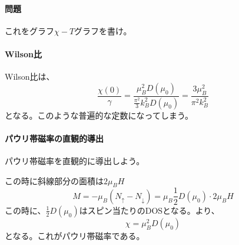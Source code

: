 \documentclass[titlepage]{ltjsarticle}
\begin{document}
\paragraph{問題}これをグラフ\(\chi-T\)グラフを書け。


\paragraph{Wilson比}
Wilson比は、
\begin{equation}
  \frac{\chi(0)}{\gamma} = \frac{\mu_B^2 D(\mu_0)}{\frac{\pi^2}{3}k_B^2 D(\mu_0)} = \frac{3\mu_B^2}{\pi^2 k_B^2}
\end{equation}
となる。このような普遍的な定数になってしまう。

\paragraph{パウリ帯磁率の直観的導出}
パウリ帯磁率を直観的に導出しよう。

この時に斜線部分の面積は\(2\mu_BH\)
\begin{equation}
  M = - \mu_B (N_{\uparrow} - N_{\downarrow}) = \mu_B \frac{1}{2}D(\mu_0) \cdot 2 \mu_B H
\end{equation}
この時に、\(\frac{1}{2}D(\mu_0) \)はスピン当たりのDOSとなる。より、
\begin{equation}
  \chi = \mu_B^2 D(\mu_0)
\end{equation}
となる。これがパウリ帯磁率である。
\end{document}
